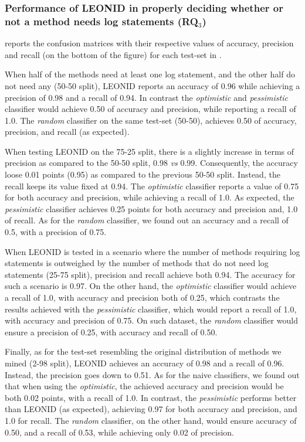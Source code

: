 \subsubsection{Performance of LEONID in properly deciding whether or not a \java method needs log statements  (RQ$_{3}$)}
\label{sec:rq3}

 reports the confusion matrices with their respective values of accuracy, precision and recall (on the bottom of the figure) for each test-set in .

When half of the methods need at least one log statement, and the other half do not need any (50-50 split), LEONID reports an accuracy of 0.96 while achieving a precision of 0.98 and a recall of 0.94. In contrast the \textit{optimistic} and \textit{pessimistic} classifier would achieve 0.50 of accuracy and precision, while reporting a recall of 1.0. 
The \textit{random} classifier on the same test-set (50-50), achieves 0.50 of accuracy, precision, and recall (as expected). 

When testing LEONID on the 75-25 split, there is a slightly increase in terms of precision as compared to the 50-50 split, 0.98 \emph{vs} 0.99. Consequently, the accuracy loose 0.01 points (0.95) as compared to the previous 50-50 split. Instead, the recall keeps its value fixed at 0.94.
The \textit{optimistic} classifier reports a value of 0.75 for both accuracy and precision, while achieving a recall of 1.0. As expected, the \textit{pessimistic} classifier achieves 0.25 points for both accuracy and precision and, 1.0 of recall. As for the \textit{random} classifier, we found out an accuracy and a recall of 0.5, with a precision of 0.75.

When LEONID is tested in a scenario where the number of methods requiring log statements is outweighed by the number of methods that do not need log statements (25-75 split), precision and recall achieve both 0.94. The accuracy for such a scenario is 0.97. 
On the other hand, the \textit{optimistic} classifier would achieve a recall of 1.0, with accuracy and precision both of 0.25, which contrasts the results achieved with the \textit{pessimistic} classifier, which would report a recall of 1.0,  with accuracy and precision of 0.75. On such dataset, the \textit{random} classifier would ensure a precision of 0.25, with accuracy and recall of 0.50.

Finally, as for the test-set resembling the original distribution of \java methods we mined (2-98 split), LEONID achieves an accuracy of 0.98 and a recall of 0.96. Instead, the precision goes down to 0.51.
As for the naive classifiers, we found out that when using the \textit{optimistic}, the achieved accuracy and precision would be both 0.02 points, with a recall of 1.0.
In contrast, the \textit{pessimistic} performs better than LEONID (as expected), achieving 0.97 for both accuracy and precision, and 1.0 for recall.
The \textit{random} classifier, on the other hand, would ensure accuracy of 0.50, and a recall of 0.53, while achieving only 0.02 of precision.


